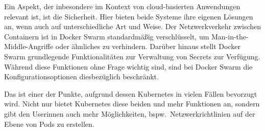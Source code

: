 Ein Aspekt, der inbesondere im Kontext von cloud-basierten Anwendungen relevant ist, ist die Sicherheit. 
Hier bieten beide Systeme ihre eigenen L\"osungen an, wenn auch auf unterschiedliche Art und Weise. 
Der Netzwerkverkehr zwischen Containern ist in Docker Swarm standardm\"a{\ss}ig verschl\"usselt, um Man-in-the-Middle-Angriffe oder \"ahnliches zu verhindern. 
Dar\"uber hinaus stellt Docker Swarm grundlegende Funktionalit\"aten zur Verwaltung von Secrets zur Verf\"ugung. 
W\"ahrend diese Funktionen ohne Frage wichtig sind, sind bei Docker Swarm  die Konfigurationsoptionen diesbez\"uglich beschr\"ankt.

Das ist einer der Punkte, aufgrund dessen Kubernetes in vielen F\"allen bevorzugt wird. 
Nicht nur bietet Kubernetes diese beiden und mehr Funktionen an, sondern gibt den Userinnen auch mehr M\"oglichkeiten, bspw.\ Netzwerkrichtlinien auf der Ebene von Pods zu erstellen.\cite{briegel_kubernetes_2023}
